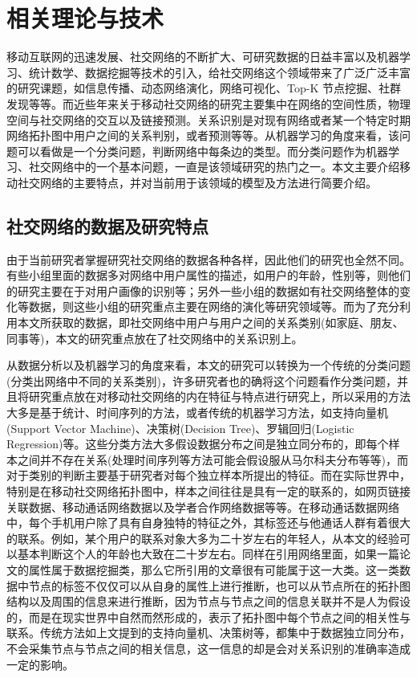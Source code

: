 \chapter{相关理论与技术}
\qquad 移动互联网的迅速发展、社交网络的不断扩大、可研究数据的日益丰富以及机器学习、统计数学、数据挖掘等技术的引入，给社交网络这个领域带来了广泛广泛丰富的研究课题，如信息传播、动态网络演化，网络可视化、Top-K 节点挖掘、社群发现等等。而近些年来关于移动社交网络的研究主要集中在网络的空间性质，物理空间与社交网络的交互以及链接预测。关系识别是对现有网络或者某一个特定时期网络拓扑图中用户之间的关系判别，或者预测等等。从机器学习的角度来看，该问题可以看做是一个分类问题，判断网络中每条边的类型。而分类问题作为机器学习、社交网络中的一个基本问题，一直是该领域研究的热门之一。本文主要介绍移动社交网络的主要特点，并对当前用于该领域的模型及方法进行简要介绍。

\section{社交网络的数据及研究特点}

由于当前研究者掌握研究社交网络的数据各种各样，因此他们的研究也全然不同。有些小组里面的数据多对网络中用户属性的描述，如用户的年龄，性别等，则他们的研究主要在于对用户画像的识别等；另外一些小组的数据如有社交网络整体的变化等数据，则这些小组的研究重点主要在网络的演化等研究领域等。而为了充分利用本文所获取的数据，即社交网络中用户与用户之间的关系类别(如家庭、朋友、同事等)，本文的研究重点放在了社交网络中的关系识别上。

从数据分析以及机器学习的角度来看，本文的研究可以转换为一个传统的分类问题(分类出网络中不同的关系类别)，许多研究者也的确将这个问题看作分类问题，并且将研究重点放在对移动社交网络的内在特征与特点进行研究上，所以采用的方法大多是基于统计、时间序列的方法，或者传统的机器学习方法，如支持向量机(Support Vector Machine)、决策树(Decision Tree)、罗辑回归(Logistic Regression)等。这些分类方法大多假设数据分布之间是独立同分布的，即每个样本之间并不存在关系(处理时间序列等方法可能会假设服从马尔科夫分布等等)，而对于类别的判断主要基于研究者对每个独立样本所提出的特征。而在实际世界中，特别是在移动社交网络拓扑图中，样本之间往往是具有一定的联系的，如网页链接关联数据、移动通话网络数据以及学者合作网络数据等等。在移动通话数据网络中，每个手机用户除了具有自身独特的特征之外，其标签还与他通话人群有着很大的联系。例如，某个用户的联系对象大多为二十岁左右的年轻人，从本文的经验可以基本判断这个人的年龄也大致在二十岁左右。同样在引用网络里面，如果一篇论文的属性属于数据挖掘类，那么它所引用的文章很有可能属于这一大类。这一类数据中节点的标签不仅仅可以从自身的属性上进行推断，也可以从节点所在的拓扑图结构以及周围的信息来进行推断，因为节点与节点之间的信息关联并不是人为假设的，而是在现实世界中自然而然形成的，表示了拓扑图中每个节点之间的相关性与联系。传统方法如上文提到的支持向量机、决策树等，都集中于数据独立同分布，不会采集节点与节点之间的相关信息，这一信息的却是会对关系识别的准确率造成一定的影响。

